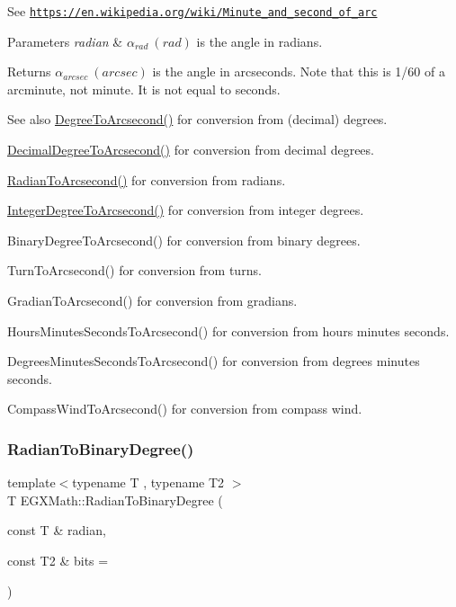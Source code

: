 See \href{https://en.wikipedia.org/wiki/Minute_and_second_of_arc}{\tt https\+://en.\+wikipedia.\+org/wiki/\+Minute\+\_\+and\+\_\+second\+\_\+of\+\_\+arc} 
\begin{DoxyParams}{Parameters}
{\em radian} & $\alpha_{rad}\ (rad)$ is the angle in radians. \\
\hline
\end{DoxyParams}
\begin{DoxyReturn}{Returns}
$\alpha_{arcsec}\ (arcsec)$ is the angle in arcseconds. Note that this is 1/60 of a arcminute, not minute. It is not equal to seconds. 
\end{DoxyReturn}
\begin{DoxySeeAlso}{See also}
\mbox{\hyperlink{group___e_g_x_math-_angle_conversions-_degree_gaf85e2d765c248f447854a807a68a5de8}{Degree\+To\+Arcsecond()}} for conversion from (decimal) degrees. 

\mbox{\hyperlink{group___e_g_x_math-_angle_conversions-_decimal_degree_gab9d5635a6e35127b5245978aba508962}{Decimal\+Degree\+To\+Arcsecond()}} for conversion from decimal degrees. 

\mbox{\hyperlink{group___e_g_x_math-_angle_conversions-_radian_ga2f952f6675a0fc54bf72bfe4e3d2664a}{Radian\+To\+Arcsecond()}} for conversion from radians. 

\mbox{\hyperlink{group___e_g_x_math-_angle_conversions-_integer_degree_gaa04058a2fea3dc3678264a05fac6e1ae}{Integer\+Degree\+To\+Arcsecond()}} for conversion from integer degrees. 

Binary\+Degree\+To\+Arcsecond() for conversion from binary degrees. 

Turn\+To\+Arcsecond() for conversion from turns. 

Gradian\+To\+Arcsecond() for conversion from gradians. 

Hours\+Minutes\+Seconds\+To\+Arcsecond() for conversion from hours minutes seconds. 

Degrees\+Minutes\+Seconds\+To\+Arcsecond() for conversion from degrees minutes seconds. 

Compass\+Wind\+To\+Arcsecond() for conversion from compass wind. 
\end{DoxySeeAlso}
\mbox{\label{group___e_g_x_math-_angle_conversions-_radian_ga13311d9b6977d514f1d6c336e7c0162b}} 
\subsubsection{\texorpdfstring{Radian\+To\+Binary\+Degree()}{RadianToBinaryDegree()}}
{\footnotesize\ttfamily template$<$typename T , typename T2 $>$ \\
T E\+G\+X\+Math\+::\+Radian\+To\+Binary\+Degree (\begin{DoxyParamCaption}\item[{const T \&}]{radian,  }\item[{const T2 \&}]{bits = {} }\end{DoxyParamCaption})}




